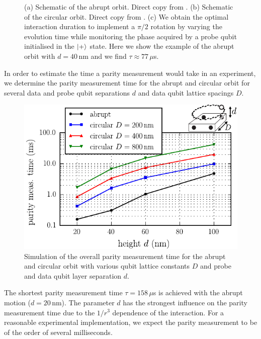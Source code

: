 \begin{figure}[H]
	\caption{(a) Schematic of the abrupt orbit. Direct copy from \cite{OGorman2016}. (b) Schematic of the circular orbit. Direct copy from \cite{OGorman2016}. (c) We obtain the optimal interaction duration to implement a $\pi/2$ rotation by varying the evolution time while monitoring the phase acquired by a probe qubit initialised in the $\ket{+}$ state. Here we show the example of the abrupt orbit with $d=40\, $nm and we find $\tau\approx 77\, \mu$s.}
	\label{FIG:abrupt_tau}
\end{figure}

In order to estimate the time a parity measurement would take in an experiment, we determine the parity measurement time for the abrupt and circular orbit for several data and probe qubit separations $d$ and data qubit lattice spacings $D$.

\begin{figure}[H]
	\includegraphics[width=\linewidth]{../Figures/tau_d_D}
	\caption{Simulation of the overall parity measurement time for the abrupt and circular orbit with various qubit lattice constants $D$ and probe and data qubit layer separation $d$.}
	\label{FIG:tau}
\end{figure}

The shortest parity measurement time $\tau=158\, \mu$s is achieved with the abrupt motion ($d=20\, $nm).
The parameter $d$ has the strongest influence on the parity measurement time due to the $1/r^3$ dependence of the interaction.
For a reasonable experimental implementation, we expect the parity measurement to be of the order of several milliseconds.

 
